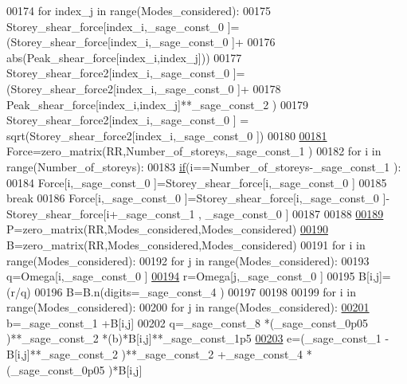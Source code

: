 \begin{DoxyCode}
00174     \textcolor{keywordflow}{for} index\_j \textcolor{keywordflow}{in} range(Modes\_considered):
00175         Storey\_shear\_force[index\_i,\_sage\_const\_0 ]=(Storey\_shear\_force[index\_i,\_sage\_const\_0 ]+
00176         abs(Peak\_shear\_force[index\_i,index\_j]))
00177         Storey\_shear\_force2[index\_i,\_sage\_const\_0 ]=(Storey\_shear\_force2[index\_i,\_sage\_const\_0 ]+
00178         Peak\_shear\_force[index\_i,index\_j]**\_sage\_const\_2 )
00179     Storey\_shear\_force2[index\_i,\_sage\_const\_0 ] = sqrt(Storey\_shear\_force2[index\_i,\_sage\_const\_0 ])
00180     
\hypertarget{main_8sage_8py_source_l00181}{}\hyperlink{namespacemain_aa91561fad2579200e566fa01f3cbc359}{00181} Force=zero\_matrix(RR,Number\_of\_storeys,\_sage\_const\_1 )
00182 \textcolor{keywordflow}{for} i \textcolor{keywordflow}{in} range(Number\_of\_storeys):
00183     \hyperlink{bootstrap_8min_8js_ac2d69f5011896c6ed4a54e0dd36f6334}{if}(i==Number\_of\_storeys-\_sage\_const\_1 ):
00184         Force[i,\_sage\_const\_0 ]=Storey\_shear\_force[i,\_sage\_const\_0 ]
00185         \textcolor{keywordflow}{break}
00186     Force[i,\_sage\_const\_0 ]=Storey\_shear\_force[i,\_sage\_const\_0 ]-Storey\_shear\_force[i+\_sage\_const\_1 ,
      \_sage\_const\_0 ]
00187     
00188  
\hypertarget{main_8sage_8py_source_l00189}{}\hyperlink{namespacemain_ad403610ba53df02f8dfaff8dd64227b3}{00189} P=zero\_matrix(RR,Modes\_considered,Modes\_considered)
\hypertarget{main_8sage_8py_source_l00190}{}\hyperlink{namespacemain_a6ae8768d11174f5baf9febc5244d6f06}{00190} B=zero\_matrix(RR,Modes\_considered,Modes\_considered)
00191 \textcolor{keywordflow}{for} i \textcolor{keywordflow}{in} range(Modes\_considered):
00192     \textcolor{keywordflow}{for} j \textcolor{keywordflow}{in} range(Modes\_considered):
00193         q=Omega[i,\_sage\_const\_0 ]
\hypertarget{main_8sage_8py_source_l00194}{}\hyperlink{namespacemain_a4760f4121f66000c5570f75176649cb8}{00194}         r=Omega[j,\_sage\_const\_0 ]
00195         B[i,j]=(r/q)
00196 B=B.n(digits=\_sage\_const\_4 )
00197 
00198 
00199 \textcolor{keywordflow}{for} i \textcolor{keywordflow}{in} range(Modes\_considered):
00200     \textcolor{keywordflow}{for} j \textcolor{keywordflow}{in} range(Modes\_considered):
\hypertarget{main_8sage_8py_source_l00201}{}\hyperlink{namespacemain_ab1e783015bffd2e1d395a9099143d967}{00201}         b=\_sage\_const\_1 +B[i,j]
00202         q=\_sage\_const\_8 *(\_sage\_const\_0p05 )**\_sage\_const\_2 *(b)*B[i,j]**\_sage\_const\_1p5 
\hypertarget{main_8sage_8py_source_l00203}{}\hyperlink{namespacemain_aa7f4fe671f919f7f067f9337ef9e02c0}{00203}         e=(\_sage\_const\_1 -B[i,j]**\_sage\_const\_2 )**\_sage\_const\_2 +\_sage\_const\_4 *(\_sage\_const\_0p05 )*B[i,j]

\end{DoxyCode}

